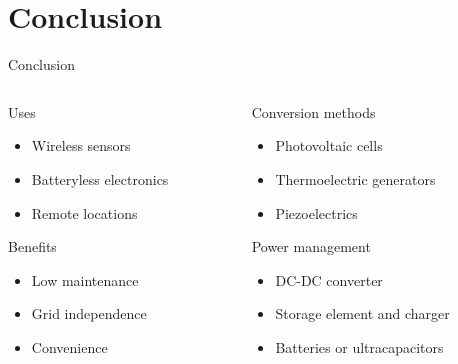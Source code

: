 \documentclass{beamer}
\begin{document}
\section{Conclusion}

\begin{frame}{Conclusion}
  \begin{columns}
    \begin{column}{0.45\textwidth}
      \begin{block}{Uses}
        \begin{itemize}
          \item Wireless sensors
	  \item Batteryless electronics
	  \item Remote locations
        \end{itemize}
      \end{block}
      \begin{block}{Benefits}
        \begin{itemize}
          \item Low maintenance
	  \item Grid independence
	  \item Convenience
        \end{itemize}
      \end{block}
    \end{column}
    \begin{column}{0.5\textwidth}
      \begin{block}{Conversion methods}
        \begin{itemize}
          \item Photovoltaic cells
	  \item Thermoelectric generators
	  \item Piezoelectrics
        \end{itemize}
      \end{block}
      \begin{block}{Power management}
        \begin{itemize}
          \item DC-DC converter
	  \item Storage element and charger
	  \item Batteries or ultracapacitors
        \end{itemize}
      \end{block}
    \end{column}
  \end{columns}
\end{frame}
\end{document}
